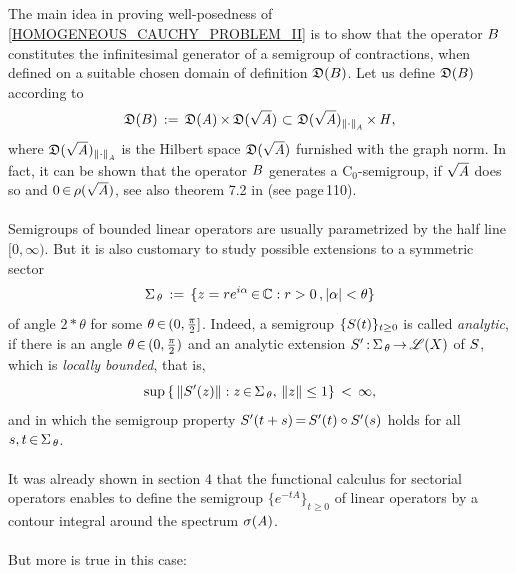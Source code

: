\documentclass[11pt,twoside]{article}
\begin{document}
\subparagraph{}
The main idea in proving well-posedness of \eqref{HOMOGENEOUS_CAUCHY_PROBLEM_II}
is to show that the operator ${B}$
constitutes the infinitesimal generator of a semigroup of contractions,
when defined on a suitable chosen domain of definition $\mathfrak{D}({B})$.
Let us define $\mathfrak{D}({B})$ according to
\[
\mathfrak{D}({B}) \,:=\,
\mathfrak{D}(\mathit{A}) {\,\times\,} \mathfrak{D}(\sqrt{\mathit{A}} )
\, {\,\subset\,} \,
\mathfrak{D}(\sqrt{\mathit{A}} )_{\left\lVert \cdot \right\rVert_{\mathit{A}}} {\,\times\,} \mathit{H},
\]
where $\mathfrak{D}(\sqrt{\mathit{A}} )_{\left\lVert \cdot \right\rVert_{\mathit{A}}}$
is the Hilbert space $\mathfrak{D}(\sqrt{\mathit{A}} )$
furnished with the graph norm.
In fact,
it can be shown that
the operator ${B}$ generates a C$_0$-semigroup,
if $\sqrt{\mathit{A}}$ does so and $0 {\,\in\,} \rho(\sqrt{\mathit{A}})$,
see also theorem 7.2 in \cite{Go} (see page\,110).

\paragraph{} %
Semigroups of bounded linear operators are usually parametrized
by the half line $[0,\infty)$.
But it is also customary to study possible extensions to a symmetric sector
\[
\Sigma_{\,\theta} \eqdef
\{z=re^{i\alpha} \xeof \C: r > 0\,, \abs{\alpha} < \theta\}
\]
of angle $2* \theta$ for some $\theta {\,\in\,} (0,\frac{\pi}{2}]$.
Indeed,
a semigroup $\{{S}(t)\}_{t \geq 0}$ is called \textit{analytic},
if there is an angle $\theta {\,\in\,} (0,\frac{\pi}{2})$
and an analytic extension ${S}' {\,:\,} \Sigma_{\,\theta} {\,\to\,} \mathscr{L}(X)$ of ${S}$,
which is \textit{locally bounded},
that is,
\[
\sup \,
\{ \, \left\lVert {S}'(z) \right\rVert: z {\,\in\,} \Sigma_{\,\theta}, \, \left\lVert z \right\rVert \leq 1 \}
\, < \, \infty,
\]
and in which the semigroup property ${S}'(t+s) {\,=\,} {S}'(t) \circ {S}'(s)$
holds for all $s,t {\,\in\,} \Sigma_{\,\theta}$.

\paragraph{} %
It was already shown in section 4
that the functional calculus for sectorial operators enables
to define the semigroup $\{e^{-tA}\}_{t \geq 0}$ of linear operators
by a contour integral around the spectrum $\sigma(\mathit{A})$.

\paragraph{}
But more is true in this case:
\end{document}
